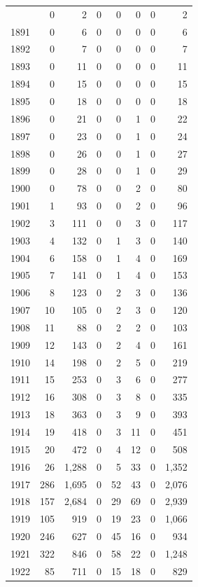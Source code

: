 \documentclass[
  english,
]{article}
\begin{document}
\begin{longtable}[t]{lrrrrrrr}
\endfoot
\bottomrule
\endlastfoot
1890 & 0 & 2 & 0 & 0 & 0 & 0 & 2\\
1891 & 0 & 6 & 0 & 0 & 0 & 0 & 6\\
1892 & 0 & 7 & 0 & 0 & 0 & 0 & 7\\
1893 & 0 & 11 & 0 & 0 & 0 & 0 & 11\\
1894 & 0 & 15 & 0 & 0 & 0 & 0 & 15\\
1895 & 0 & 18 & 0 & 0 & 0 & 0 & 18\\
1896 & 0 & 21 & 0 & 0 & 1 & 0 & 22\\
1897 & 0 & 23 & 0 & 0 & 1 & 0 & 24\\
1898 & 0 & 26 & 0 & 0 & 1 & 0 & 27\\
1899 & 0 & 28 & 0 & 0 & 1 & 0 & 29\\
1900 & 0 & 78 & 0 & 0 & 2 & 0 & 80\\
1901 & 1 & 93 & 0 & 0 & 2 & 0 & 96\\
1902 & 3 & 111 & 0 & 0 & 3 & 0 & 117\\
1903 & 4 & 132 & 0 & 1 & 3 & 0 & 140\\
1904 & 6 & 158 & 0 & 1 & 4 & 0 & 169\\
1905 & 7 & 141 & 0 & 1 & 4 & 0 & 153\\
1906 & 8 & 123 & 0 & 2 & 3 & 0 & 136\\
1907 & 10 & 105 & 0 & 2 & 3 & 0 & 120\\
1908 & 11 & 88 & 0 & 2 & 2 & 0 & 103\\
1909 & 12 & 143 & 0 & 2 & 4 & 0 & 161\\
1910 & 14 & 198 & 0 & 2 & 5 & 0 & 219\\
1911 & 15 & 253 & 0 & 3 & 6 & 0 & 277\\
1912 & 16 & 308 & 0 & 3 & 8 & 0 & 335\\
1913 & 18 & 363 & 0 & 3 & 9 & 0 & 393\\
1914 & 19 & 418 & 0 & 3 & 11 & 0 & 451\\
1915 & 20 & 472 & 0 & 4 & 12 & 0 & 508\\
1916 & 26 & 1,288 & 0 & 5 & 33 & 0 & 1,352\\
1917 & 286 & 1,695 & 0 & 52 & 43 & 0 & 2,076\\
1918 & 157 & 2,684 & 0 & 29 & 69 & 0 & 2,939\\
1919 & 105 & 919 & 0 & 19 & 23 & 0 & 1,066\\
1920 & 246 & 627 & 0 & 45 & 16 & 0 & 934\\
1921 & 322 & 846 & 0 & 58 & 22 & 0 & 1,248\\
1922 & 85 & 711 & 0 & 15 & 18 & 0 & 829\\

\end{longtable}
\end{document}

